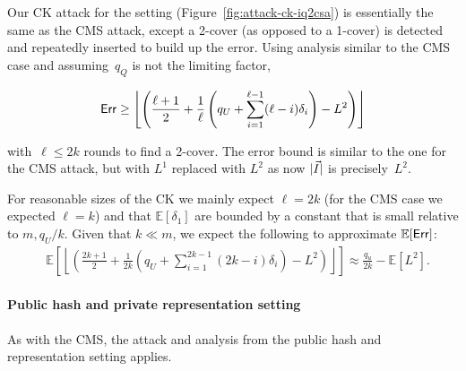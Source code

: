 Our CK attack for the setting (Figure~\ref{fig:attack-ck-iq2csa}) is essentially the same as the CMS attack, except a 2-cover (as opposed to a 1-cover) is detected and repeatedly inserted to build up the error. Using analysis similar to the CMS case and assuming~$q_Q$ is not the limiting factor,

$$\mathsf{Err} \geq 
	\left \lfloor \left( \frac{\ell+1}{2} + \frac{1}{\ell}\left(q_U + \sum_{i=1}^{\ell-1}(\ell-i)\delta_i \right) - L^2 \right) \right\rfloor$$

with~$\ell \leq 2k$ rounds to find a 2-cover. The error bound is similar to the one for the CMS attack, but with $L^1$ replaced with $L^2$ as now $|\vec{I}|$ is precisely~$L^2$.  

For reasonable sizes of the CK we mainly expect $\ell = 2k$ (for the CMS case we expected $\ell{=}k$) and that $\mathbb{E}\left[\delta_1\right]$ are bounded by a constant that is small relative to $m, q_U/k$. Given that $k \ll m$, we expect the following to approximate $\mathbb{E}[\mathsf{Err}]$:
\begin{align*}
	&\mathbb{E}\left[\left\lfloor \left( \frac{2k+1}{2} + \frac{1}{2k}\left(q_U + \sum_{i=1}^{2k-1}(2k-i)\delta_i \right) - L^2 \right) \right\rfloor\right]\approx \frac{q_u}{2k} -  \mathbb{E}[L^2].
\end{align*}

\paragraph{Public hash and private representation setting}
As with the CMS, the attack and analysis from the public hash and representation setting applies.

